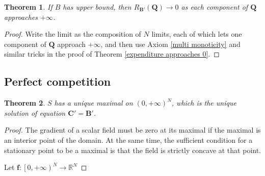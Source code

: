 \documentclass{article}
\newtheorem{theorem}{Theorem}[subsection]
\begin{document}
\begin{theorem}
If $B$ has upper bound, then $R_{\mathbf B'}\left(\mathbf Q\right)\to0$ as each component of $\mathbf Q$ approaches $+\infty$.
\end{theorem}
\begin{proof}
Write the limit as the composition of $N$ limits, each of which lets one component of $\mathbf Q$ approach $+\infty$,
and then use Axiom \ref{multi monoticity} and similar tricks in the proof of Theorem \ref{expenditure approaches 0}.
\end{proof}

\subsection{Perfect competition}

\begin{theorem}
$S$ has a unique maximal on $\left(0,+\infty\right)^N$,
which is the unique solution of equation $\mathbf C'=\mathbf B'$.
\end{theorem}
\begin{proof}
The gradient of a scalar field must be zero at its maximal if the maximal is an interior point of the domain.
At the same time, the sufficient condition for a stationary point to be a maximal is that the field is strictly concave at that point.

Let $\mathbf f:\left[0,+\infty\right)^N\to\mathbb R^N$
\end{proof}



\end{document}
